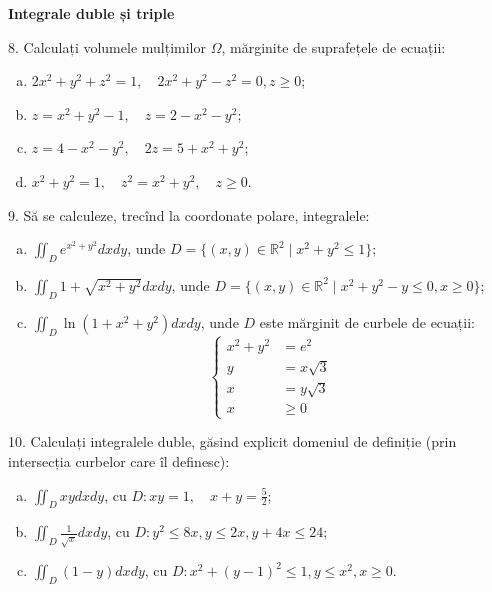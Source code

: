 \documentclass[11pt,a4paper]{article}
\newcommand\ds{\displaystyle}
\newcommand\RR{\mathbb{R}}
\theoremstyle{dotless}
\theoremstyle{dotlessdr}
\begin{document}
\vspace{2cm}



\textbf{Integrale duble și triple}

8. Calculați volumele mulțimilor $ \Omega $, mărginite de suprafețele de ecuații:
\begin{enumerate}[(a)]
\item $ 2x^2 + y^2 + z^2 = 1, \quad 2x^2 + y^2 - z^2 = 0, z \geq 0 $;
\item $ z = x^2 + y^2 - 1, \quad z = 2 - x^2 - y^2 $;
\item $ z = 4 - x^2 - y^2, \quad 2z = 5 + x^2 + y^2 $;
\item $ x^2 + y^2 = 1, \quad z^2 = x^2 + y^2, \quad z \geq 0 $.
\end{enumerate}

\vspace{1cm}

9. Să se calculeze, trecînd la coordonate polare, integralele:
\begin{enumerate}[(a)]
\item $ \ds\iint_D e^{x^2 + y^2} dxdy$, unde $D = \{(x, y) \in \RR^2 \mid x^2 + y^2 \leq 1 \} $;
\item $ \ds\iint_D 1 + \sqrt{x^2 + y^2} dxdy$, unde $D = \{(x, y) \in \RR^2 \mid %
  x^2 + y^2 - y \leq 0, x \geq 0\} $;
\item $ \ds\iint_D \ln(1 + x^2 + y^2) dxdy $, unde $D$ este mărginit de curbele de ecuații:
  \[
    \begin{cases}
      x^2 + y^2 &= e^2 \\
      y &= x \sqrt{3} \\
      x &= y\sqrt{3} \\
      x &\geq 0
    \end{cases}
  \]
\end{enumerate}

\vspace{1cm}

10. Calculați integralele duble, găsind explicit domeniul de definiție (prin intersecția
curbelor care îl definesc):
\begin{enumerate}[(a)]
\item $ \ds\iint_D xydxdy$, cu $D: xy = 1, \quad x + y = \frac{5}{2} $;
\item $ \ds\iint_D \frac{1}{\sqrt{x}} dxdy$, cu $D: y^2 \leq 8x, y \leq 2x, y + 4x \leq 24 $;
\item $ \ds\iint_D (1 - y) dxdy$, cu $D: x^2 + (y-1)^2 \leq 1, y \leq x^2, x \geq 0 $.
\end{enumerate}
\end{document}
